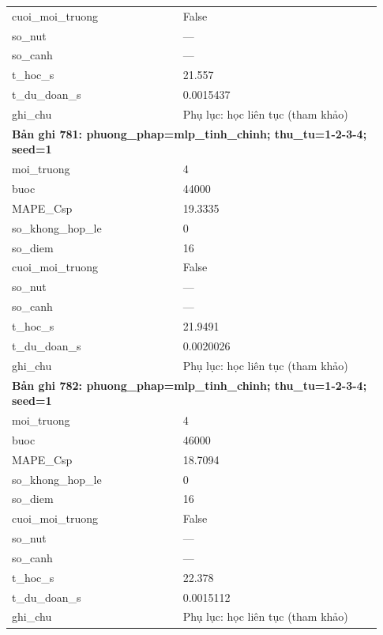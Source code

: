 \begin{longtable}{p{0.43\linewidth}p{0.50\linewidth}}
cuoi\_\allowbreak moi\_\allowbreak truong & False \\
so\_\allowbreak nut & — \\
so\_\allowbreak canh & — \\
t\_\allowbreak hoc\_\allowbreak s & 21.557 \\
t\_\allowbreak du\_\allowbreak doan\_\allowbreak s & 0.0015437 \\
ghi\_\allowbreak chu & Phụ lục: học liên tục (tham khảo) \\
\midrule
\multicolumn{2}{p{0.95\linewidth}}{\textbf{Bản ghi 781: phuong\_phap=mlp\_tinh\_chinh; thu\_tu=1-2-3-4; seed=1}} \\
moi\_\allowbreak truong & 4 \\
buoc & 44000 \\
MAPE\_\allowbreak Csp & 19.3335 \\
so\_\allowbreak khong\_\allowbreak hop\_\allowbreak le & 0 \\
so\_\allowbreak diem & 16 \\
cuoi\_\allowbreak moi\_\allowbreak truong & False \\
so\_\allowbreak nut & — \\
so\_\allowbreak canh & — \\
t\_\allowbreak hoc\_\allowbreak s & 21.9491 \\
t\_\allowbreak du\_\allowbreak doan\_\allowbreak s & 0.0020026 \\
ghi\_\allowbreak chu & Phụ lục: học liên tục (tham khảo) \\
\midrule
\multicolumn{2}{p{0.95\linewidth}}{\textbf{Bản ghi 782: phuong\_phap=mlp\_tinh\_chinh; thu\_tu=1-2-3-4; seed=1}} \\
moi\_\allowbreak truong & 4 \\
buoc & 46000 \\
MAPE\_\allowbreak Csp & 18.7094 \\
so\_\allowbreak khong\_\allowbreak hop\_\allowbreak le & 0 \\
so\_\allowbreak diem & 16 \\
cuoi\_\allowbreak moi\_\allowbreak truong & False \\
so\_\allowbreak nut & — \\
so\_\allowbreak canh & — \\
t\_\allowbreak hoc\_\allowbreak s & 22.378 \\
t\_\allowbreak du\_\allowbreak doan\_\allowbreak s & 0.0015112 \\
ghi\_\allowbreak chu & Phụ lục: học liên tục (tham khảo) \\

\end{longtable}
